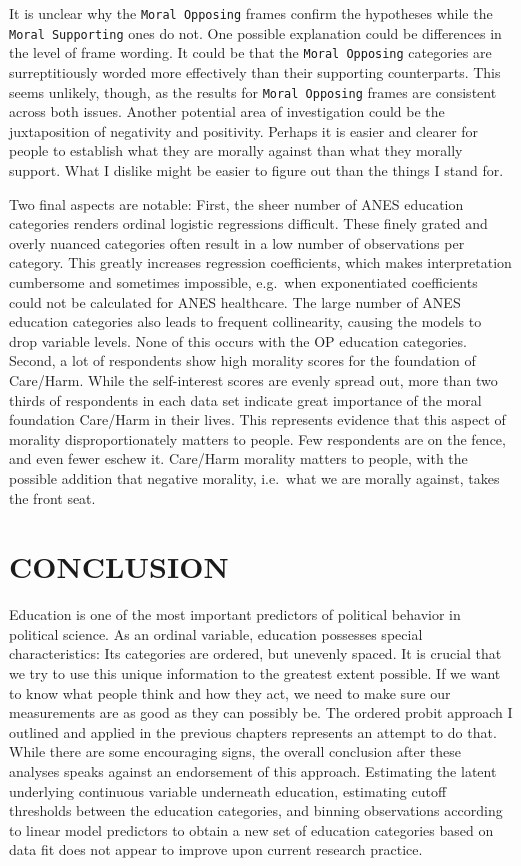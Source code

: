 \documentclass[12pt,econ]{sources/authesis}
\begin{document}
It is unclear why the \texttt{Moral\ Opposing} frames confirm the hypotheses while the \texttt{Moral\ Supporting} ones do not. One possible explanation could be differences in the level of frame wording. It could be that the \texttt{Moral\ Opposing} categories are surreptitiously worded more effectively than their supporting counterparts. This seems unlikely, though, as the results for \texttt{Moral\ Opposing} frames are consistent across both issues. Another potential area of investigation could be the juxtaposition of negativity and positivity. Perhaps it is easier and clearer for people to establish what they are morally against than what they morally support. What I dislike might be easier to figure out than the things I stand for.

Two final aspects are notable: First, the sheer number of ANES education categories renders ordinal logistic regressions difficult. These finely grated and overly nuanced categories often result in a low number of observations per category. This greatly increases regression coefficients, which makes interpretation cumbersome and sometimes impossible, e.g.~when exponentiated coefficients could not be calculated for ANES healthcare. The large number of ANES education categories also leads to frequent collinearity, causing the models to drop variable levels. None of this occurs with the OP education categories. Second, a lot of respondents show high morality scores for the foundation of Care/Harm. While the self-interest scores are evenly spread out, more than two thirds of respondents in each data set indicate great importance of the moral foundation Care/Harm in their lives. This represents evidence that this aspect of morality disproportionately matters to people. Few respondents are on the fence, and even fewer eschew it. Care/Harm morality matters to people, with the possible addition that negative morality, i.e.~what we are morally against, takes the front seat.

\hypertarget{conclusion}{%
\chapter{CONCLUSION}\label{conclusion}}

Education is one of the most important predictors of political behavior in political science. As an ordinal variable, education possesses special characteristics: Its categories are ordered, but unevenly spaced. It is crucial that we try to use this unique information to the greatest extent possible. If we want to know what people think and how they act, we need to make sure our measurements are as good as they can possibly be. The ordered probit approach I outlined and applied in the previous chapters represents an attempt to do that. While there are some encouraging signs, the overall conclusion after these analyses speaks against an endorsement of this approach. Estimating the latent underlying continuous variable underneath education, estimating cutoff thresholds between the education categories, and binning observations according to linear model predictors to obtain a new set of education categories based on data fit does not appear to improve upon current research practice.
\end{document}
